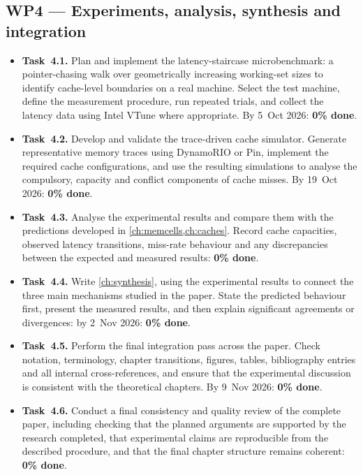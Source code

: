 \documentclass[12pt,a4paper]{report}
\begin{document}
\subsection*{WP4 --- Experiments, analysis, synthesis and integration}
\begin{itemize}[leftmargin=*]
  \item \textbf{Task~4.1.} Plan and implement the latency-staircase
    microbenchmark: a pointer-chasing walk over geometrically
    increasing working-set sizes to identify cache-level boundaries on
    a real machine. Select the test machine, define the measurement
    procedure, run repeated trials, and collect the latency data using
    Intel VTune where appropriate. By 5~Oct 2026: \textbf{0\% done}.

  \item \textbf{Task~4.2.} Develop and validate the trace-driven cache
    simulator. Generate representative memory traces using DynamoRIO
    or Pin, implement the required cache configurations, and use the
    resulting simulations to analyse the compulsory, capacity and
    conflict components of cache misses. By 19~Oct 2026:
    \textbf{0\% done}.

  \item \textbf{Task~4.3.} Analyse the experimental results and compare
    them with the predictions developed in \cref{ch:memcells,ch:caches}.
    Record cache capacities, observed latency transitions, miss-rate
    behaviour and any discrepancies between the expected and measured
    results: \textbf{0\% done}.

  \item \textbf{Task~4.4.} Write \cref{ch:synthesis}, using the
    experimental results to connect the three main mechanisms studied
    in the paper. State the predicted behaviour first, present the
    measured results, and then explain significant agreements or
    divergences: by 2~Nov 2026: \textbf{0\% done}.

  \item \textbf{Task~4.5.} Perform the final integration pass across
    the paper. Check notation, terminology, chapter transitions,
    figures, tables, bibliography entries and all internal
    cross-references, and ensure that the experimental discussion is
    consistent with the theoretical chapters. By 9~Nov 2026:
    \textbf{0\% done}.

  \item \textbf{Task~4.6.} Conduct a final consistency and quality
    review of the complete paper, including checking that the planned
    arguments are supported by the research completed, that
    experimental claims are reproducible from the described procedure,
    and that the final chapter structure remains coherent:
    \textbf{0\% done}.
\end{itemize}
\end{document}
